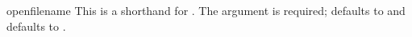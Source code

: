 \begin{funcdesc}{open}{filename}
This is a shorthand for 
 .  The 
argument is required;  defaults to  and
 defaults to .
\end{funcdesc}

\begin{seealso}
\end{seealso}
